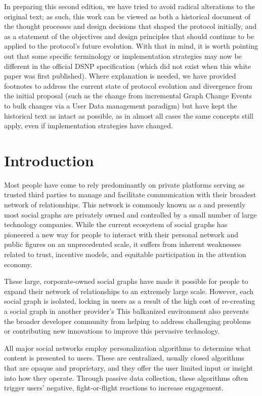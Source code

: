 \documentclass[12pt,letterpaper]{article}
\begin{document}
In preparing this second edition, we have tried to avoid radical alterations to the original
text; as such, this work can be viewed as both a historical document of the thought
processes and design decisions that shaped the protocol initially, and as a statement of the
objectives and design principles that should continue to be applied to the protocol's future
evolution. With that in mind, it is worth pointing out that some specific terminology or
implementation strategies may now be different in the official DSNP specification (which did
not exist when this white paper was first published). Where explanation is needed, we have
provided footnotes to address the current state of protocol evolution and divergence from
the initial proposal (such as the change from incremental Graph Change Events to bulk
changes via a User Data management paradigm) but have kept the historical text as intact as
possible, as in almost all cases the same concepts still apply, even if implementation
strategies have changed.

\clearpage
\section{Introduction}\label{sec:introduction}

Most people have come to rely predominantly on private platforms serving as trusted third
parties to manage and facilitate communication with their broadest network of
relationships. This network is commonly known as a  and presently most
social graphs are privately owned and controlled by a small number of large technology
companies. While the current ecosystem of social graphs has pioneered a new way for people
to interact with their personal network and public figures on an unprecedented scale, it
suffers from inherent weaknesses related to trust, incentive models, and equitable
participation in the attention economy.

These large, corporate-owned social graphs have made it possible for people to expand
their network of relationships to an extremely large scale. However, each social graph is
isolated, locking in users as a result of the high cost of re-creating a social graph in
another provider's  This balkanized environment also prevents the
broader developer community from helping to address challenging problems or contributing
new innovations to improve this pervasive technology.

All major social networks employ personalization algorithms to determine what content is
presented to users. These are centralized, usually closed algorithms that are opaque and
proprietary, and they offer the user limited input or insight into how they operate.
Through passive data collection, these algorithms often trigger users' negative,
fight-or-flight reactions to increase engagement.\cite{psychology_today_2017}
\end{document}
